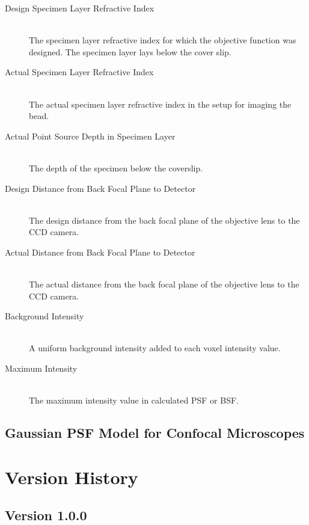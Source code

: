 \documentclass[11pt,titlepage,twoside]{article}
\begin{document}
\begin{description}
  \item[Design Specimen Layer Refractive Index] \hfill \\
   The specimen layer refractive index for which the objective function was designed. The specimen layer lays below the cover slip.
  
  \item[Actual Specimen Layer Refractive Index] \hfill \\
   The actual specimen layer refractive index in the setup for imaging the bead.
  
  \item[Actual Point Source Depth in Specimen Layer] \hfill \\
   The depth of the specimen below the coverslip.
  
  \item[Design Distance from Back Focal Plane to Detector] \hfill \\
   The design distance from the back focal plane of the objective lens to the CCD camera.
  
  \item[Actual Distance from Back Focal Plane to Detector] \hfill \\
   The actual distance from the back focal plane of the objective lens to the CCD camera.
  
  \item[Background Intensity] \hfill \\
   A uniform background intensity added to each voxel intensity value.
  
  \item[Maximum Intensity] \hfill \\
   The maximum intensity value in calculated PSF or BSF.
      
\end{description}

\subsection{Gaussian PSF Model for Confocal Microscopes}

\section{Version History}

\subsection{Version 1.0.0}
\end{document}

